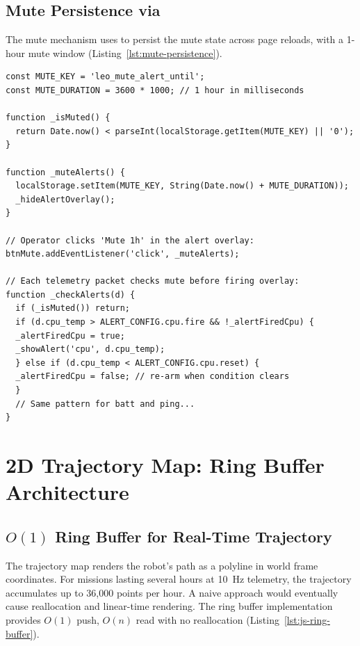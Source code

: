 \subsection{Mute Persistence via }

The mute mechanism uses  to persist the mute state across page reloads, with a 1-hour mute window (Listing~\ref{lst:mute-persistence}).

\begin{lstlisting}[caption={Alert mute persistence with hysteresis-based re-arming}, label={lst:mute-persistence}]
const MUTE_KEY = 'leo_mute_alert_until';
const MUTE_DURATION = 3600 * 1000; // 1 hour in milliseconds

function _isMuted() {
  return Date.now() < parseInt(localStorage.getItem(MUTE_KEY) || '0');
}

function _muteAlerts() {
  localStorage.setItem(MUTE_KEY, String(Date.now() + MUTE_DURATION));
  _hideAlertOverlay();
}

// Operator clicks 'Mute 1h' in the alert overlay:
btnMute.addEventListener('click', _muteAlerts);

// Each telemetry packet checks mute before firing overlay:
function _checkAlerts(d) {
  if (_isMuted()) return;
  if (d.cpu_temp > ALERT_CONFIG.cpu.fire && !_alertFiredCpu) {
  _alertFiredCpu = true;
  _showAlert('cpu', d.cpu_temp);
  } else if (d.cpu_temp < ALERT_CONFIG.cpu.reset) {
  _alertFiredCpu = false; // re-arm when condition clears
  }
  // Same pattern for batt and ping...
}
\end{lstlisting}

\section{2D Trajectory Map: Ring Buffer Architecture}

\subsection{\texorpdfstring{$O(1)$}{O(1)} Ring Buffer for Real-Time Trajectory}

The trajectory map renders the robot's path as a polyline in world frame coordinates. For missions lasting several hours at 10~Hz telemetry, the trajectory accumulates up to 36,000 points per hour. A naive  approach would eventually cause reallocation and linear-time rendering. The ring buffer implementation provides $O(1)$ push, $O(n)$ read with no reallocation (Listing~\ref{lst:js-ring-buffer}).

